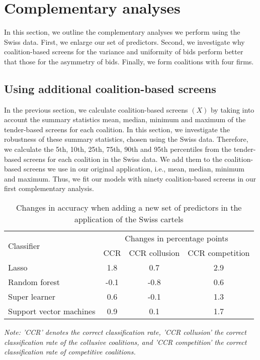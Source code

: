 \documentclass[a4paper,11pt]{article}
\begin{document}
	\section{Complementary analyses}\label{companaly}
	
	In this section, we outline the complementary analyses we perform using the Swiss data. First, we enlarge our set of predictors. Second, we investigate why coalition-based screens for the variance and uniformity of bids perform better that those for the asymmetry of bids. Finally, we form coalitions with four firms. 
	
	\subsection{Using additional coalition-based screens}
	
	In the previous section, we calculate coalition-based screens $(X)$ by taking into account the summary statistics mean, median, minimum and maximum of the tender-based screens for each coalition. In this section, we investigate the robustness of these summary statistics, chosen using the Swiss data. Therefore, we calculate the 5th, 10th, 25th, 75th, 90th and 95th percentiles from the tender-based screens for each coalition in the Swiss data. We add them to the coalition-based screens we use in our original application, i.e., mean, median, minimum and maximum. Thus, we fit our models with ninety coalition-based screens in our first complementary analysis.
	
	\begin{table}[ht]
		\caption{Changes in accuracy when adding a new set of predictors in the application of the Swiss cartels}\label{CCRnewpredictors}
		\begin{center}
			\begin{tabular}{lccc}
				\hline
				\multirow{2}{*}{Classifier} & \multicolumn{3}{c}{Changes in percentage points}               \\ \cline{2-4} 
				& CCR  & CCR collusion  & CCR competition \\ \hline
				Lasso                       & 1.8     & 0.7               & 2.9                \\
				Random   forest             & -0.1    & -0.8              & 0.6                \\
				Super learner               & 0.6     & -0.1              & 1.3                \\
				Support   vector machines   & 0.9     & 0.1               & 1.7                \\ \hline
			\end{tabular}
		\end{center}
		\par
		\textit{Note: 'CCR' denotes the correct classification rate, 'CCR collusion' the correct classification rate of the collusive coalitions, and 'CCR competition' the correct classification rate of competitive coalitions.}
	\end{table}
	
\end{document}
